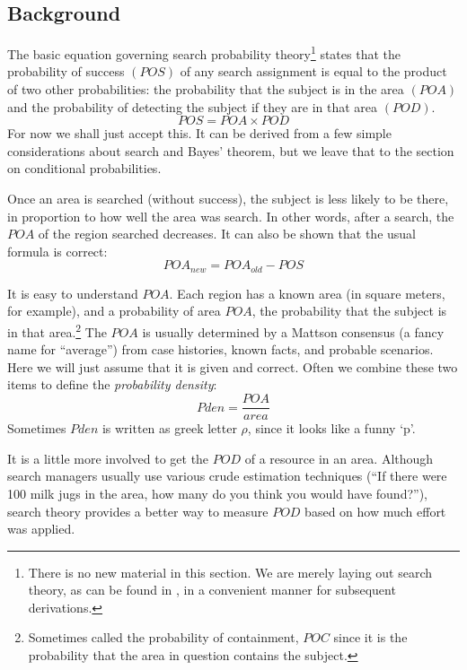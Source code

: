 \documentclass[10pt]{article}
\begin{document}
\subsection{Background}
\label{sec:Background}

The basic equation governing search probability theory\footnote{There
  is no new material in this section. We are merely laying out search
  theory, as can be found in \cite{}, in a convenient manner for
  subsequent derivations.} states that the probability of success
$(POS)$ of any search assignment is equal to the product of two other
probabilities: the probability that the subject is in the area $(POA)$
and the probability of detecting the subject if they are in that area
$(POD)$.
\begin{equation}
  \label{eq:POS}
  POS = POA \times POD
\end{equation}
For now we shall just accept this. It can be derived from a few simple
considerations about search and Bayes' theorem, but we leave that to
the section on conditional probabilities.

Once an area is searched (without
success), the subject is less likely to be there, in proportion to how 
well the area was search. In other words, after a search, the $POA$ of 
the region searched decreases. It can also be shown that the usual
formula is correct:
\begin{equation}
  \label{eq:POA_new}
  POA_{new} = POA_{old} - POS
\end{equation}

It is easy to understand $POA$. Each region has a known area (in
square meters, for example), and a probability of area $POA$, the
probability that the subject is in that area.\footnote{Sometimes
  called the probability of containment, $POC$ since it is the
  probability that the area in question contains the subject.} The
$POA$ is usually determined by a Mattson consensus (a fancy name for
``average'') from case histories, known facts, and probable scenarios.
Here we will just assume that it is given and correct. Often we
combine these two items to define the \emph{probability density}:
\begin{equation}
  \label{eq:2}
  Pden = \frac{POA}{area}
\end{equation}
Sometimes $Pden$ is written as greek letter $\rho$, since it looks
like a funny `p'.

It is a little more involved to get the $POD$ of a resource in an
area. Although search managers usually use various crude estimation
techniques (``If there were 100 milk jugs in the area, how many do you 
think you would have found?''), search theory provides a better way to 
measure $POD$ based on how much effort was applied.
\end{document}
